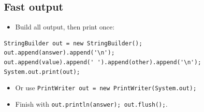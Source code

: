 \documentclass[10pt]{article}
\newcommand{\code}[1]{\texttt{#1}}
\begin{document}
\subsection{Fast output}
\begin{itemize}
  \item Build all output, then print once:
\end{itemize}
\begin{framed}
\footnotesize
\begin{verbatim}
StringBuilder out = new StringBuilder();
out.append(answer).append('\n');
out.append(value).append(' ').append(other).append('\n');
System.out.print(out);
\end{verbatim}
\end{framed}
\begin{itemize}
  \item Or use \code{PrintWriter out = new PrintWriter(System.out);}
  \item Finish with \code{out.println(answer); out.flush();}.
\end{itemize}
\end{document}
